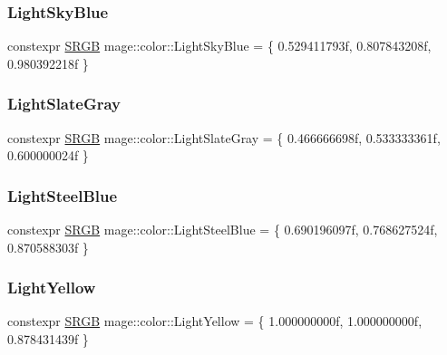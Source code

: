 \hypertarget{namespacemage_1_1color_abd0ba374788da77ea7d1bac0095a9ec0}{}\label{namespacemage_1_1color_abd0ba374788da77ea7d1bac0095a9ec0} 
\subsubsection{\texorpdfstring{Light\+Sky\+Blue}{LightSkyBlue}}
{\footnotesize\ttfamily constexpr \hyperlink{structmage_1_1_s_r_g_b}{S\+R\+GB} mage\+::color\+::\+Light\+Sky\+Blue = \{ 0.\+529411793f, 0.\+807843208f, 0.\+980392218f \}}

\hypertarget{namespacemage_1_1color_adad3232eaac43b514b064428263271e9}{}\label{namespacemage_1_1color_adad3232eaac43b514b064428263271e9} 
\subsubsection{\texorpdfstring{Light\+Slate\+Gray}{LightSlateGray}}
{\footnotesize\ttfamily constexpr \hyperlink{structmage_1_1_s_r_g_b}{S\+R\+GB} mage\+::color\+::\+Light\+Slate\+Gray = \{ 0.\+466666698f, 0.\+533333361f, 0.\+600000024f \}}

\hypertarget{namespacemage_1_1color_ab667892d618c565a7f143f291ee8cecc}{}\label{namespacemage_1_1color_ab667892d618c565a7f143f291ee8cecc} 
\subsubsection{\texorpdfstring{Light\+Steel\+Blue}{LightSteelBlue}}
{\footnotesize\ttfamily constexpr \hyperlink{structmage_1_1_s_r_g_b}{S\+R\+GB} mage\+::color\+::\+Light\+Steel\+Blue = \{ 0.\+690196097f, 0.\+768627524f, 0.\+870588303f \}}

\hypertarget{namespacemage_1_1color_aee9bffbe060c632fbaa1f5d88724d9c3}{}\label{namespacemage_1_1color_aee9bffbe060c632fbaa1f5d88724d9c3} 
\subsubsection{\texorpdfstring{Light\+Yellow}{LightYellow}}
{\footnotesize\ttfamily constexpr \hyperlink{structmage_1_1_s_r_g_b}{S\+R\+GB} mage\+::color\+::\+Light\+Yellow = \{ 1.\+000000000f, 1.\+000000000f, 0.\+878431439f \}}

